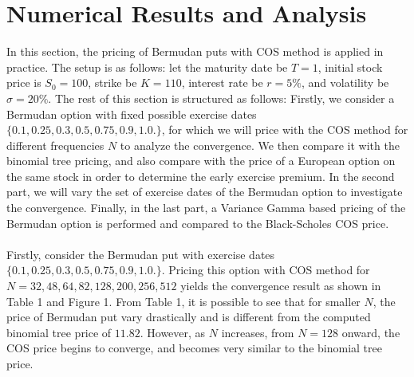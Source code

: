 \documentclass{article}
\begin{document}
\section{Numerical Results and Analysis}
In this section, the pricing of Bermudan puts with COS method is applied in practice. The setup is as follows: let the maturity date be $T=1$, initial stock price is $S_0=100$, strike be $K=110$, interest rate be $r=5\%$, and volatility be $\sigma = 20 \%$. The rest of this section is structured as follows: Firstly, we consider a Bermudan option with fixed possible exercise dates $\{ 0.1, 0.25, 0.3, 0.5, 0.75, 0.9, 1.0.\}$, for which we will price with the COS method for different frequencies $N$ to analyze the convergence. We then compare it with the binomial tree pricing, and also compare with the price of a European option on the same stock in order to determine the early exercise premium. In the second part, we will vary the set of exercise dates of the Bermudan option to investigate the convergence. Finally, in the last part, a Variance Gamma based pricing of the Bermudan option is performed and compared to the Black-Scholes COS price.
\\ \\
Firstly, consider the Bermudan put with exercise dates $\{ 0.1, 0.25, 0.3, 0.5, 0.75, 0.9, 1.0.\}$. Pricing this option with COS method for $N=32, 48, 64, 82, 128, 200, 256, 512$ yields the convergence result as shown in Table 1 and Figure 1. From Table 1, it is possible to see that for smaller $N$, the price of Bermudan put vary drastically and is different from the computed binomial tree price of $11.82$. However, as $N$ increases, from $N=128$ onward, the COS price begins to converge, and becomes very similar to the binomial tree price.
\end{document}

